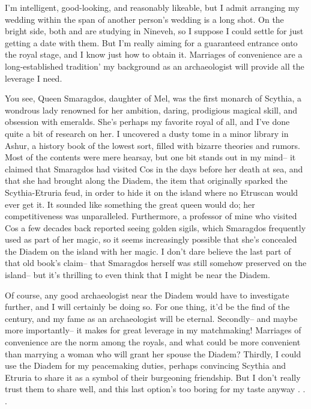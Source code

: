 \documentclass[char]{Kos}
\begin{document}
I'm intelligent, good-looking, and reasonably likeable, but I admit arranging my wedding within the span of another person's wedding is a long shot. On the bright side, both \cPoet{\nickname} and \cWard{\nickname} are studying in Nineveh, so I suppose I could settle for just getting a date with them. But I'm really aiming for a guaranteed entrance onto the royal stage, and I know just how to obtain it. Marriages of convenience are a long-established tradition' my background as an archaeologist will provide all the leverage I need.

You see, Queen Smaragdos, daughter of Mel, was the first monarch of Scythia, a wondrous lady renowned for her ambition, daring, prodigious magical skill, and obsession with emeralds. She's perhaps my favorite royal of all, and I've done quite a bit of research on her. I uncovered a dusty tome in a minor library in Ashur, a history book of the lowest sort, filled with bizarre theories and rumors. Most of the contents were mere hearsay, but one bit stands out in my mind-- it claimed that Smaragdos had visited Cos in the days before her death at sea, and that she had brought along the Diadem, the item that originally sparked the Scythia-Etruria feud, in order to hide it on the island where no Etruscan would ever get it. It sounded like something the great queen would do; her competitiveness was unparalleled. Furthermore, a professor of mine who visited Cos a few decades back reported seeing golden sigils, which Smaragdos frequently used as part of her magic, so it seems increasingly possible that she's concealed the Diadem on the island with her magic. I don't dare believe the last part of that old book's claim-- that Smaragdos herself was still somehow preserved on the island-- but it's thrilling to even think that I might be near the Diadem.

Of course, any good archaeologist near the Diadem would have to investigate further, and I will certainly be doing so. For one thing, it'd be the find of the century, and my fame as an archaeologist will be eternal. Secondly-- and maybe more importantly-- it makes for great leverage in my matchmaking! Marriages of convenience are the norm among the royals, and what could be more convenient than marrying a woman who will grant her spouse the Diadem? Thirdly, I could use the Diadem for my peacemaking duties, perhaps convincing Scythia and Etruria to share it as a symbol of their burgeoning friendship. But I don't really trust them to share well, and this last option's too boring for my taste anyway . . .
\end{document}
